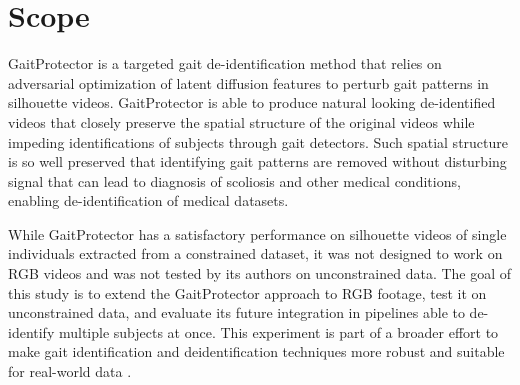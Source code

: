 \section{Scope}

GaitProtector \cite{duan2026gaitprotector} is a targeted gait de-identification method that relies on adversarial optimization of latent diffusion features 
to perturb gait patterns in silhouette videos. GaitProtector is able to produce natural looking de-identified videos that closely preserve the 
spatial structure of the original videos while impeding identifications of subjects through gait detectors. Such spatial structure is so well preserved that
identifying gait patterns are removed without disturbing signal that can lead to diagnosis of scoliosis and other medical conditions, enabling de-identification
of medical datasets.

While GaitProtector has a satisfactory performance on silhouette videos of single individuals extracted from a constrained dataset, it was not designed to work on RGB videos and was
not tested by its authors on unconstrained data. The goal of this study is to extend the GaitProtector approach to RGB footage, test it on unconstrained data, 
and evaluate its future integration in pipelines able to de-identify multiple subjects at once. This experiment is part of a broader effort to make gait identification
and deidentification techniques more robust and suitable for real-world data \cite{fan2023opengait}.

